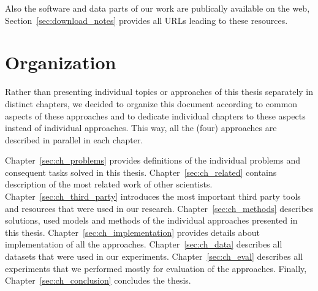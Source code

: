 Also the software and data parts of our work are publically available on the web, Section~\ref{sec:download_notes} provides all URLs leading to these resources.  


\section{Organization}

Rather than presenting individual topics or approaches of this thesis separately in distinct chapters, we decided to organize this document according to common aspects of these approaches and to dedicate individual chapters to these aspects instead of individual approaches. This way, all the (four) approaches are described in parallel in each chapter. 

Chapter~\ref{sec:ch_problems} provides definitions of the individual problems and consequent tasks solved in this thesis.
Chapter~\ref{sec:ch_related} contains description of the most related work of other scientists.
Chapter~\ref{sec:ch_third_party} introduces the most important third party tools and resources that were used in our research.
Chapter~\ref{sec:ch_methods} describes solutions, used models and methods of the individual approaches presented in this thesis.
Chapter~\ref{sec:ch_implementation} provides details about implementation of all the approaches.
Chapter~\ref{sec:ch_data} describes all datasets that were used in our experiments.
Chapter~\ref{sec:ch_eval} describes all experiments that we performed mostly for evaluation of the approaches.
Finally, Chapter~\ref{sec:ch_conclusion} concludes the thesis.

